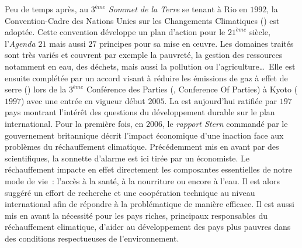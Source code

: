 Peu de temps après, au $3^{ème}$ \textit{Sommet de la Terre} se tenant à Rio en $1992$, la
Convention-Cadre des Nations Unies sur les Changements Climatiques
()
est adoptée. Cette convention développe un plan d’action pour le $21^{ème}$ siècle,
l’\textit{Agenda $21$} mais aussi $27$ principes pour sa mise en œuvre. Les domaines
traités sont très variés et couvrent par exemple la pauvreté, la gestion des ressources
notamment en eau, des déchets, mais aussi la pollution ou l’agriculture\dots\  Elle est
ensuite complétée par un accord visant à réduire les émissions de gaz à effet de serre
() lors de la $3^{ème}$ Conférence des Parties (, Conference Of Parties) à
Kyoto ($1997$) avec une entrée en vigueur début $2005$. La  est aujourd’hui
ratifiée par $197$ pays montrant l’intérêt des questions du développement durable sur le
plan international. Pour la première fois, en $2006$, le \textit{rapport Stern}
\parencite{Stern2006} commandé par le gouvernement britannique décrit l’impact
économique d’une inaction face aux problèmes du réchauffement climatique.
Précédemment mis en avant par des scientifiques, la sonnette d’alarme est ici tirée par un
économiste. Le
réchauffement impacte en effet directement les composantes essentielles de notre mode de
vie~: l’accès à la santé, à la nourriture ou encore à l’eau. Il est alors suggéré un effort
de recherche et une coopération technique au niveau international afin de répondre à la
problématique de manière efficace. Il est aussi mis en avant la nécessité pour les pays
riches, principaux responsables du réchauffement climatique, d’aider au développement des
pays plus pauvres dans des conditions respectueuses de l’environnement.

